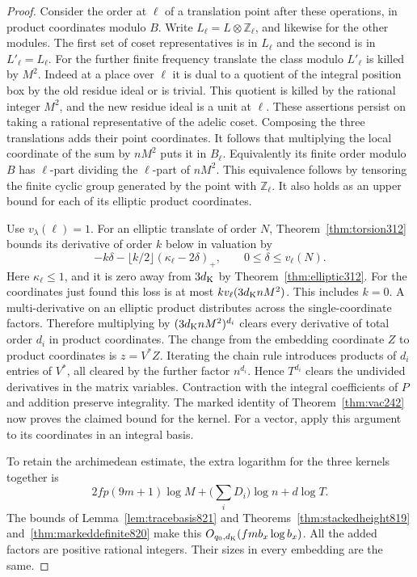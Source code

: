 \documentclass[a4paper,11pt]{article}
\theoremstyle{definition}
\theoremstyle{remark}
\newcommand{\ZZ}{\mathbb Z}\newcommand{\ord}{\operatorname{ord}}
\numberwithin{equation}{section}
\begin{document}
\begin{proof}
Consider the order at \(\ell\) of a translation point after
these operations, in product coordinates modulo \(B\). Write
\(L_\ell=L\otimes\ZZ_\ell\), and likewise for the other modules.
The first set of coset representatives is in \(L_\ell\) and
the second is in \(L'_\ell=L_\ell\). For the further finite
frequency translate the class modulo \(L'_\ell\) is killed by
\(M^2\). Indeed at a place over \(\ell\) it is dual to a
quotient of the integral position box by the old residue ideal
or is trivial. This quotient is killed by the rational integer
\(M^2\), and the new residue ideal is a unit at \(\ell\).
These assertions persist on taking a rational representative
of the adelic coset. Composing the three translations adds
their point coordinates. It follows that multiplying the local
coordinate of the sum by \(nM^2\) puts it in \(B_\ell\).
Equivalently its finite order modulo \(B\) has \(\ell\)-part
dividing the \(\ell\)-part of \(nM^2\). This equivalence
follows by tensoring the finite cyclic group generated by
the point with \(\ZZ_\ell\). It also holds as an upper bound
for each of its elliptic product coordinates.

Use \(v_\lambda(\ell)=1\). For an elliptic translate of
order \(N\), Theorem~\ref{thm:torsion312} bounds its derivative
of order \(k\) below in valuation by
\[
          -k\delta-\lfloor k/2\rfloor
                         (\kappa_\ell-2\delta)_+,
          \qquad 0\le\delta\le v_\ell(N).
\]
Here \(\kappa_\ell\le1\), and it is zero away from
\(3d_{\rm K}\) by Theorem~\ref{thm:elliptic312}.
For the coordinates just found this loss is at most
\(k v_\ell(3d_{\rm K} n M^2)\). This includes \(k=0\).
A multi-derivative on an elliptic product distributes across
the single-coordinate factors. Therefore multiplying by
\((3d_{\rm K} n M^2)^{d_i}\) clears every derivative of
total order \(d_i\) in product coordinates. The change from
the embedding coordinate \(Z\) to product coordinates is
\(z=V^*Z\). Iterating the chain rule introduces products of
\(d_i\) entries of \(V^*\), all cleared by the further
factor \(n^{d_i}\). Hence \(T^{d_i}\) clears the undivided
derivatives in the matrix variables. Contraction with the
integral coefficients of \(P\) and addition preserve
integrality. The marked identity of Theorem~\ref{thm:vac242}
now proves the claimed bound for the kernel. For a vector,
apply this argument to its coordinates in an integral basis.

To retain the archimedean estimate, the extra logarithm for
the three kernels together is
\[
   2fp(9m+1)\log M+\Big(\sum_i D_i\Big)\log n+d\log T.
\]
The bounds of Lemma~\ref{lem:tracebasis821} and
Theorems~\ref{thm:stackedheight819} and~\ref{thm:markeddefinite820}
make this \(O_{q_0,d_{\rm K}}(f m b_x\log b_x)\).
All the added factors are positive rational integers.
Their sizes in every embedding are the same.
\end{proof}
\end{document}
